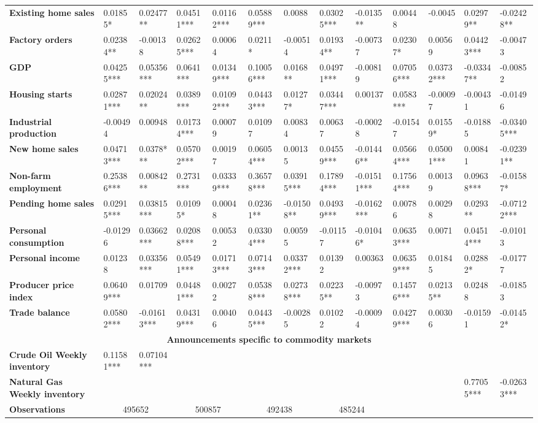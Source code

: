 \begin{sidewaystable}
{\begin{tabular}{@{}lllllllllllll@{}}
\textbf{Existing home sales}& 0.01855* & 0.02477** & 0.04511*** & 0.01162*** & 0.05889*** & 0.0088 & 0.03025*** & -0.0135** & 0.00448 & -0.0045 & 0.02979** & -0.02428** \\ \textbf{Factory orders}& 0.02384** & -0.00138 & 0.02625*** & 0.00064 & 0.0211* & -0.00514 & 0.01934** & -0.00737 & 0.02307* & 0.00569 & 0.04423*** & -0.00473 \\ \textbf{GDP}& 0.04255*** & 0.05356*** & 0.0641*** & 0.01349*** & 0.10056*** & 0.0168** & 0.04971*** & -0.00819 & 0.07056*** & 0.03732*** & -0.03347** & -0.00852 \\ \textbf{Housing starts}& 0.02871*** & 0.02024** & 0.0389*** & 0.01092*** & 0.04433*** & 0.01277* & 0.03447*** & 0.00137 & 0.0583*** & -0.00097 & -0.00431 & -0.01496 \\ \textbf{Industrial production}& -0.00494 & 0.00948 & 0.01734*** & 0.00079 & 0.01097 & 0.00834 & 0.00637 & -0.00028 & -0.01547 & 0.01559* & -0.01885 & -0.03405*** \\ \textbf{New home sales}& 0.04713*** & 0.0378*** & 0.05702*** & 0.00197 & 0.06054*** & 0.00135 & 0.04559*** & -0.01446** & 0.05664*** & 0.05001*** & 0.00841 & -0.02391** \\ \textbf{Non-farm employment}& 0.25386*** & 0.00842** & 0.2731*** & 0.03339*** & 0.36578*** & 0.03915*** & 0.17894*** & -0.01511*** & 0.17564*** & 0.00139 & 0.09638*** & -0.01587* \\ \textbf{Pending home sales}& 0.02915*** & 0.03815*** & 0.01095* & 0.00048 & 0.02361** & -0.01508** & 0.04939*** & -0.0162*** & 0.00786 & 0.00298 & 0.0293** & -0.07122*** \\ \textbf{Personal consumption}& -0.01296 & 0.03662*** & 0.02088*** & 0.00532 & 0.03304*** & 0.00595 & -0.01157 & -0.01046* & 0.06353*** & 0.0071 & 0.04514*** & -0.01013 \\ \textbf{Personal income}& 0.01238 & 0.03356*** & 0.05491*** & 0.01713*** & 0.07143*** & 0.03372*** & 0.01392 & 0.00363 & 0.06359*** & 0.01845 & 0.02882* & -0.01777 \\ \textbf{Producer price index}& 0.06409*** & 0.01709 & 0.04481*** & 0.00272 & 0.05388*** & 0.02738*** & 0.02235** & -0.00973 & 0.14576*** & 0.02135** & 0.02488 & -0.01853 \\ \textbf{Trade balance}& 0.05802*** & -0.01613*** & 0.04319*** & 0.00406 & 0.04435*** & -0.00285 & 0.01022 & -0.00094 & 0.04279*** & 0.00306 & -0.01591 & -0.01452* \\  \midrule \multicolumn{13}{c}{\textbf{Announcements specific to commodity markets}} \\ \midrule \textbf{Crude Oil Weekly inventory}& 0.11581*** & 0.07104*** &  &  &  &  &  &  &  &  &  &  \\ \textbf{Natural Gas Weekly inventory}&  &  &  &  &  &  &  &  &  &  & 0.77055*** & -0.02633*** \\  \midrule \textbf{Observations}             &\multicolumn{2}{c}{ 495652 }                                                 & \multicolumn{2}{c}{ 500857 }                                                 & \multicolumn{2}{c}{ 492438 }                                                 & \multicolumn{2}{c}{ 485244 }                                     
\end{tabular}}
\end{sidewaystable}
